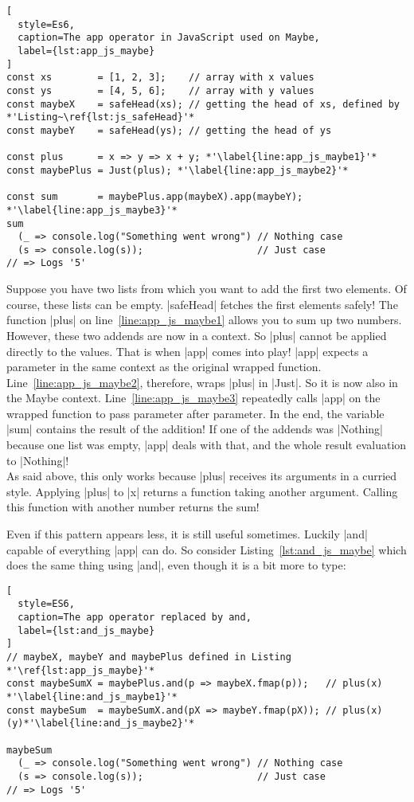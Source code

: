 \begin{lstlisting}[
  style=Es6,
  caption=The app operator in JavaScript used on Maybe,
  label={lst:app_js_maybe}
]
const xs        = [1, 2, 3];    // array with x values
const ys        = [4, 5, 6];    // array with y values
const maybeX    = safeHead(xs); // getting the head of xs, defined by *'Listing~\ref{lst:js_safeHead}'*
const maybeY    = safeHead(ys); // getting the head of ys

const plus      = x => y => x + y; *'\label{line:app_js_maybe1}'*
const maybePlus = Just(plus); *'\label{line:app_js_maybe2}'*

const sum       = maybePlus.app(maybeX).app(maybeY); *'\label{line:app_js_maybe3}'*
sum 
  (_ => console.log("Something went wrong") // Nothing case
  (s => console.log(s));                    // Just case 
// => Logs '5'
\end{lstlisting}
Suppose you have two lists from which you want to add the first two elements.
Of course, these lists can be empty. |safeHead| fetches the first elements
safely! The function |plus| on line~\ref{line:app_js_maybe1} allows you to sum
up two numbers. However, these two addends are now in a context. So |plus|
cannot be applied directly to the values. That is when |app| comes into play!
|app| expects a parameter in the same context as the original wrapped function.
Line~\ref{line:app_js_maybe2}, therefore, wraps |plus| in |Just|. So it is
now also in the Maybe context. Line~\ref{line:app_js_maybe3} repeatedly calls
|app| on the wrapped function to pass parameter after parameter. In the end,
the variable |sum| contains the result of the addition! If one of the addends
was |Nothing| because one list was empty, |app| deals with that, and the whole
result evaluation to |Nothing|! \\ 
As said above, this only works because |plus| receives its arguments in a
curried style. Applying |plus| to |x| returns a function taking another
argument. Calling this function with another number returns the sum!

Even if this pattern appears less, it is still useful sometimes. Luckily |and|
capable of everything |app| can do. So consider Listing~\ref{lst:and_js_maybe}
which does the same thing using |and|, even though it is a bit more to type:

\begin{lstlisting}[
  style=ES6,
  caption=The app operator replaced by and,
  label={lst:and_js_maybe}
]
// maybeX, maybeY and maybePlus defined in Listing    *'\ref{lst:app_js_maybe}'*
const maybeSumX = maybePlus.and(p => maybeX.fmap(p));   // plus(x) *'\label{line:and_js_maybe1}'*
const maybeSum  = maybeSumX.and(pX => maybeY.fmap(pX)); // plus(x)(y)*'\label{line:and_js_maybe2}'*

maybeSum 
  (_ => console.log("Something went wrong") // Nothing case
  (s => console.log(s));                    // Just case
// => Logs '5'
\end{lstlisting}

